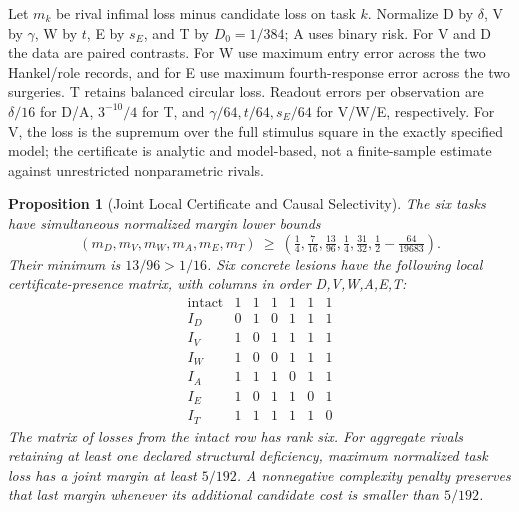 \documentclass[11pt,a4paper]{article}
\newtheorem{proposition}[theorem]{Proposition}
\theoremstyle{definition}
\begin{document}
Let $m_k$ be rival infimal loss minus candidate loss on task $k$. Normalize D by $\delta$, V by $\gamma$, W by $t$, E by $s_E$, and T by $D_0=1/384$; A uses binary risk. For V and D the data are paired contrasts. For W use maximum entry error across the two Hankel/role records, and for E use maximum fourth-response error across the two surgeries. T retains balanced circular loss. Readout errors per observation are $\delta/16$ for D/A, $3^{-10}/4$ for T, and $\gamma/64,t/64,s_E/64$ for V/W/E, respectively. For V, the loss is the supremum over the full stimulus square in the exactly specified model; the certificate is analytic and model-based, not a finite-sample estimate against unrestricted nonparametric rivals.

\begin{proposition}[Joint Local Certificate and Causal Selectivity]\label{prop:bridge-six-port-certificate}
The six tasks have simultaneous normalized margin lower bounds
\[
 (m_D,m_V,m_W,m_A,m_E,m_T)\ \ge\
 \left(\tfrac14,\tfrac7{16},\tfrac{13}{96},\tfrac14,
       \tfrac{31}{32},\tfrac12-\tfrac{64}{19683}\right).
\]
Their minimum is $13/96>1/16$. Six concrete lesions have the following local certificate-presence matrix, with columns in order D,V,W,A,E,T:
\[
\begin{array}{c|rrrrrr}
 \text{intact}&1&1&1&1&1&1\\
 I_D&0&1&0&1&1&1\\
 I_V&1&0&1&1&1&1\\
 I_W&1&0&0&1&1&1\\
 I_A&1&1&1&0&1&1\\
 I_E&1&0&1&1&0&1\\
 I_T&1&1&1&1&1&0
\end{array}
\]
The matrix of losses from the intact row has rank six. For aggregate rivals retaining at least one declared structural deficiency, maximum normalized task loss has a joint margin at least $5/192$. A nonnegative complexity penalty preserves that last margin whenever its additional candidate cost is smaller than $5/192$.
\end{proposition}
\end{document}
